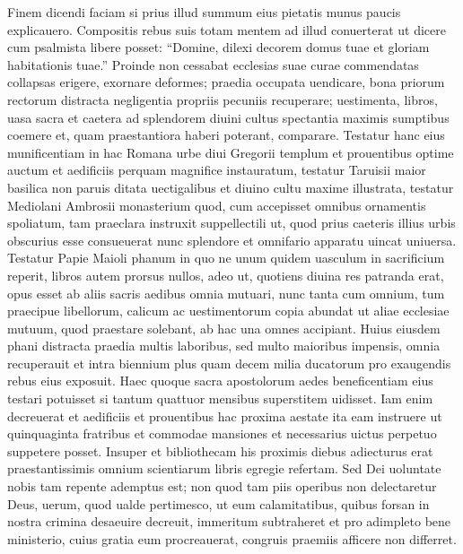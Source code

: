 \documentclass[a5paper,twoside]{article}
\begin{document}
Finem dicendi faciam si prius illud summum eius pietatis munus paucis explicauero.  Compositis rebus suis totam mentem ad illud conuerterat ut dicere cum psalmista libere posset: ``Domine, dilexi decorem domus tuae et gloriam habitationis tuae.''  Proinde non cessabat ecclesias suae curae commendatas collapsas erigere, exornare deformes; praedia occupata uendicare, bona priorum rectorum distracta negligentia propriis pecuniis recuperare; uestimenta, libros, uasa sacra et caetera ad splendorem diuini cultus spectantia maximis sumptibus coemere et, quam praestantiora haberi poterant, comparare.  Testatur hanc eius munificentiam in hac Romana urbe diui Gregorii templum et prouentibus optime auctum et aedificiis perquam magnifice instauratum, testatur Taruisii maior basilica non paruis ditata uectigalibus et diuino cultu maxime illustrata, testatur Mediolani Ambrosii monasterium quod, cum accepisset omnibus ornamentis spoliatum, tam praeclara instruxit suppellectili ut, quod prius caeteris illius urbis obscurius esse consueuerat nunc splendore et omnifario apparatu uincat uniuersa. Testatur Papie Maioli phanum in quo ne unum quidem uasculum in sacrificium reperit, libros autem prorsus nullos, adeo ut, quotiens diuina res patranda erat, opus esset ab aliis sacris aedibus omnia mutuari, nunc tanta cum omnium, tum praecipue libellorum, calicum ac uestimentorum copia abundat ut aliae ecclesiae mutuum, quod praestare solebant, ab hac una omnes accipiant.  Huius eiusdem phani distracta praedia multis laboribus, sed multo maioribus impensis, omnia recuperauit et intra biennium plus quam decem milia ducatorum pro exaugendis rebus eius exposuit.  Haec quoque sacra apostolorum aedes beneficentiam eius testari potuisset si tantum quattuor mensibus superstitem uidisset.  Iam enim decreuerat et aedificiis et prouentibus hac proxima aestate ita eam instruere ut quinquaginta fratribus et commodae mansiones et necessarius uictus perpetuo suppetere posset.  Insuper et bibliothecam his proximis diebus adiecturus erat praestantissimis omnium scientiarum libris egregie refertam.  Sed Dei uoluntate nobis tam repente ademptus est; non quod tam piis operibus non delectaretur Deus, uerum, quod ualde pertimesco, ut eum calamitatibus, quibus forsan in nostra crimina desaeuire decreuit, immeritum subtraheret et pro adimpleto bene ministerio, cuius gratia eum procreauerat, congruis praemiis afficere non differret.
\end{document}

